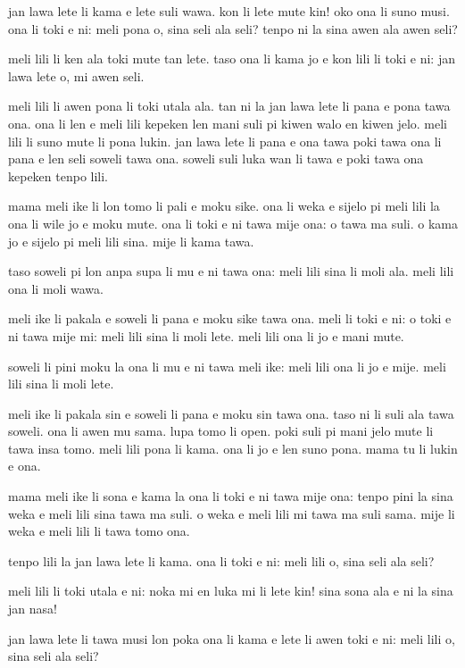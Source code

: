 jan lawa lete li kama e lete suli wawa. 
kon li lete mute kin! 
oko ona li suno musi. 
ona li toki e ni: 
\glqq meli pona o, sina seli ala seli? 
tenpo ni la sina awen ala awen seli?\grqq

meli lili li ken ala toki mute tan lete. 
taso ona li kama jo e kon lili li toki e ni: 
\glqq jan lawa lete o, mi awen seli.\grqq 

meli lili li awen pona li toki utala ala. 
tan ni la jan lawa lete li pana e pona tawa ona. 
ona li len e meli lili kepeken len mani suli pi kiwen walo en kiwen jelo. 
meli lili li suno mute li pona lukin. 
jan lawa lete li pana e ona tawa poki tawa ona li pana e len seli soweli tawa ona. 
soweli suli luka wan li tawa e poki tawa ona kepeken tenpo lili.

mama meli ike li lon tomo li pali e moku sike. 
ona li weka e sijelo pi meli lili la ona li wile jo e moku mute. 
ona li toki e ni tawa mije ona: 
\glqq o tawa ma suli. 
o kama jo e sijelo pi meli lili sina.\grqq 
mije li kama tawa. 

taso soweli pi lon anpa supa li mu e ni tawa ona: 
  \glqq meli lili sina li moli ala. 
meli lili ona li moli wawa.\grqq

meli ike li pakala e soweli li pana e moku sike tawa ona. 
meli li toki e ni: 
\glqq o toki e ni tawa mije mi: 
\glqq meli lili sina li moli lete. 
meli lili ona li jo e mani mute.\grqq

soweli li pini moku la ona li mu e ni tawa meli ike: 
\glqq meli lili ona li jo e mije. 
meli lili sina li moli lete.\grqq

meli ike li pakala sin e soweli li pana e moku sin tawa ona. 
taso ni li suli ala tawa soweli. 
ona li awen mu sama. 
lupa tomo li open. 
poki suli pi mani jelo mute li tawa insa tomo. 
meli lili pona li kama. 
ona li jo e len suno pona. 
mama tu li lukin e ona.

mama meli ike li sona e kama la ona li toki e ni tawa mije ona: 
\glqq tenpo pini la sina weka e meli lili sina tawa ma suli. 
o weka e meli lili mi tawa ma suli sama.\grqq 
mije li weka e meli lili li tawa tomo ona.

tenpo lili la jan lawa lete li kama. 
ona li toki e ni: 
\glqq meli lili o, sina seli ala seli?\grqq

meli lili li toki utala e ni: 
\glqq noka mi en luka mi li lete kin! 
sina sona ala e ni la sina jan nasa!\grqq

jan lawa lete li tawa musi lon poka ona li kama e lete li awen toki e ni: 
\glqq meli lili o, sina seli ala seli?\grqq

